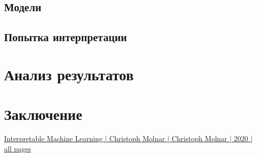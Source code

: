 \documentclass[a4paper, 12pt]{article}
\begin{document}
	\subsection{Модели}
	
	\subsection{Попытка интерпретации}
	
	\newpage
	
	\section{Анализ результатов}
	
	\newpage
	
	\section{Заключение}
	
	\newpage
	
	\begin{thebibliography}{99}
		\href{https://christophm.github.io/interpretable-ml-book/}{Interpretable Machine Learning | Christoph Molnar | Christoph Molnar | 2020 | all pages}
	\end{thebibliography}
\end{document}
